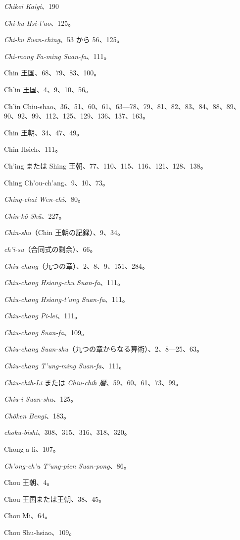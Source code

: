 \documentclass[11pt]{article}
\newcommand{\scanpage}[2]{\clearpage\setcounter{footnote}{0}\noindent{\footnotesize\color{gray}PDF #1 頁 · #2}\par\medskip}
\begin{document}
\scanpage{0347}{印刷頁 333}
\emph{Chikei Kaigi}、190\par
\emph{Chi-ku Hsi-t'ao}、125。\par
\emph{Chi-ku Suan-ching}、53 から 56、125。\par
\emph{Chi-mong Fa-ming Suan-fa}、111。\par
Chin 王国、68、79、83、100。\par
Ch'in 王国、4、9、10、56。\par
Ch'in Chiu-shao、36、51、60、61、63---78、79、81、82、83、84、88、89、90、92、99、112、125、129、136、137、163。\par
Chin 王朝、34、47、49。\par
Chin Hsieh、111。\par
Ch'ing または Shing 王朝、77、110、115、116、121、128、138。\par
Ching Ch'ou-ch'ang、9、10、73。\par
\emph{Ching-chai Wen-chi}、80。\par
\emph{Chin-kō Shū}、227。\par
\emph{Chin-shu}（Chin 王朝の記録）、9、34。\par
\emph{ch'i-su}（合同式の剰余）、66。\par
\emph{Chiu-chang}（九つの章）、2、8、9、151、284。\par
\emph{Chiu-chang Hsiang-chu Suan-fa}、111。\par
\emph{Chiu-chang Hsiang-t'ung Suan-fa}、111。\par
\emph{Chiu-chang Pi-lei}、111。\par
\emph{Chiu-chang Suan-fa}、109。\par
\emph{Chiu-chang Suan-shu}（九つの章からなる算術）、2、8---25、63。\par
\emph{Chiu-chang T'ung-ming Suan-fa}、111。\par
\emph{Chiu-chih-Li} または \emph{Chiu-chih 暦}、59、60、61、73、99。\par
\emph{Chiu-i Suan-shu}、125。\par
\emph{Chōken Bengi}、183。\par
\emph{choku-bishi}、308、315、316、318、320。\par
Chong-a-li、107。\par
\emph{Ch'ong-ch'u T'ung-pien Suan-pong}、86。\par
Chou 王朝、4。\par
Chou 王国または王朝、38、45。\par
Chou Mi、64。\par
Chou Shu-hsiao、109。\par
\end{document}
